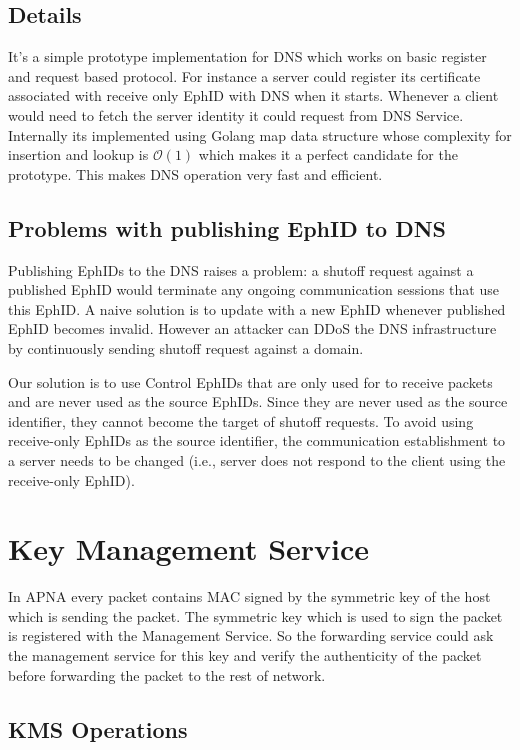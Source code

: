 \subsection{Details}
It's a simple prototype implementation for DNS which works on basic register and request based protocol. For instance a server could register its certificate associated with receive only EphID with DNS when it starts. Whenever a client would need to fetch the server identity it could request from DNS Service. Internally its implemented using Golang map data structure whose complexity for insertion and lookup is $\mathcal{O}(1)$ which makes it a perfect candidate for the prototype. This makes DNS operation very fast and efficient.

\subsection{Problems with publishing EphID to DNS}
Publishing EphIDs to the DNS raises a problem: a shutoff request against a published EphID would terminate any ongoing communication sessions that use this EphID. A naive solution is to update with a new EphID whenever published EphID becomes invalid. However an attacker can DDoS the DNS infrastructure by continuously sending shutoff request against a domain.

Our solution is to use Control EphIDs that are only used for to receive packets and are never used as the source EphIDs. Since they are never used as the source identifier, they cannot become the target of shutoff requests. To avoid using receive-only EphIDs as the source identifier, the communication establishment to a server needs to be changed (i.e., server does not respond to the client using the receive-only EphID).

\section{Key Management Service} \label{sec:kms}
In APNA every packet contains MAC signed by the symmetric key of the host which is sending the packet. The symmetric key which is used to sign the packet is registered with the Management Service. So the forwarding service could ask the management service for this key and verify the authenticity of the packet before forwarding the packet to the rest of network.

\subsection{KMS Operations}
